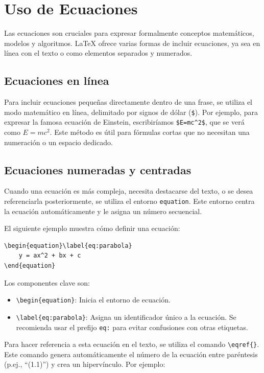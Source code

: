\documentclass[11pt,a4paper]{book}
\begin{document}
\section{Uso de Ecuaciones}
Las ecuaciones son cruciales para expresar formalmente conceptos matemáticos, modelos y algoritmos. LaTeX ofrece varias formas de incluir ecuaciones, ya sea en línea con el texto o como elementos separados y numerados.

\subsection{Ecuaciones en línea}
Para incluir ecuaciones pequeñas directamente dentro de una frase, se utiliza el modo matemático en línea, delimitado por signos de dólar (\verb|$|). Por ejemplo, para expresar la famosa ecuación de Einstein, escribiríamos \verb|$E=mc^2$|, que se verá como $E=mc^2$. Este método es útil para fórmulas cortas que no necesitan una numeración o un espacio dedicado.

\subsection{Ecuaciones numeradas y centradas}
Cuando una ecuación es más compleja, necesita destacarse del texto, o se desea referenciarla posteriormente, se utiliza el entorno \texttt{equation}. Este entorno centra la ecuación automáticamente y le asigna un número secuencial.

El siguiente ejemplo muestra cómo definir una ecuación:
\begin{verbatim}
\begin{equation}\label{eq:parabola}
    y = ax^2 + bx + c
\end{equation}
\end{verbatim}

Los componentes clave son:
\begin{itemize}
    \item \verb|\begin{equation}|: Inicia el entorno de ecuación.
    \item \verb|\label{eq:parabola}|: Asigna un identificador único a la ecuación. Se recomienda usar el prefijo \texttt{eq:} para evitar confusiones con otras etiquetas.
\end{itemize}

Para hacer referencia a esta ecuación en el texto, se utiliza el comando \verb|\eqref{}|. Este comando genera automáticamente el número de la ecuación entre paréntesis (p.ej., ``(1.1)'') y crea un hipervínculo. Por ejemplo:
\end{document}
